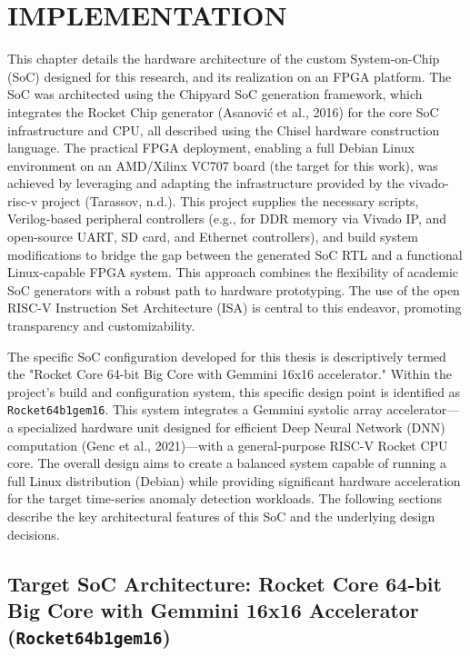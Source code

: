 
\chapter{IMPLEMENTATION}
\label{Chapter3}

This chapter details the hardware architecture of the custom System-on-Chip (SoC) designed for this research, and its realization on an FPGA platform. The SoC was architected using the Chipyard SoC generation framework, which integrates the Rocket Chip generator (Asanović et al., 2016) for the core SoC infrastructure and CPU, all described using the Chisel hardware construction language. The practical FPGA deployment, enabling a full Debian Linux environment on an AMD/Xilinx VC707 board (the target for this work), was achieved by leveraging and adapting the infrastructure provided by the vivado-risc-v project (Tarassov, n.d.). This project supplies the necessary scripts, Verilog-based peripheral controllers (e.g., for DDR memory via Vivado IP, and open-source UART, SD card, and Ethernet controllers), and build system modifications to bridge the gap between the generated SoC RTL and a functional Linux-capable FPGA system. This approach combines the flexibility of academic SoC generators with a robust path to hardware prototyping. The use of the open RISC-V Instruction Set Architecture (ISA) is central to this endeavor, promoting transparency and customizability.

The specific SoC configuration developed for this thesis is descriptively termed the "Rocket Core 64-bit Big Core with Gemmini 16x16 accelerator." Within the project's build and configuration system, this specific design point is identified as \texttt{Rocket64b1gem16}. This system integrates a Gemmini systolic array accelerator—a specialized hardware unit designed for efficient Deep Neural Network (DNN) computation (Genc et al., 2021)—with a general-purpose RISC-V Rocket CPU core. The overall design aims to create a balanced system capable of running a full Linux distribution (Debian) while providing significant hardware acceleration for the target time-series anomaly detection workloads. The following sections describe the key architectural features of this SoC and the underlying design decisions.

\section{Target SoC Architecture: Rocket Core 64-bit Big Core with Gemmini 16x16 Accelerator (\texttt{Rocket64b1gem16})}
\label{sec:soc_config_rocket64b1gem16}


